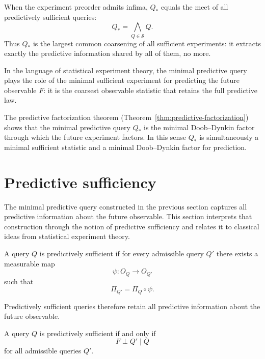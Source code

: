 \begin{remark}
When the experiment preorder admits infima, $Q_*$ equals the meet of
all predictively sufficient queries:
\[
Q_* = \bigwedge_{Q\in\mathcal S} Q.
\]
Thus $Q_*$ is the largest common coarsening of all sufficient
experiments: it extracts exactly the predictive information shared by
all of them, no more.
\end{remark}

\begin{remark}
In the language of statistical experiment theory, the minimal predictive
query plays the role of the minimal sufficient experiment for predicting
the future observable $F$: it is the coarsest observable statistic that
retains the full predictive law.
\end{remark}

\begin{remark}
The predictive factorization theorem (Theorem~\ref{thm:predictive-factorization})
shows that the minimal predictive query $Q_*$ is the minimal
Doob--Dynkin factor through which the future experiment factors.
In this sense $Q_*$ is simultaneously a minimal sufficient statistic
and a minimal Doob--Dynkin factor for prediction.
\end{remark}

\bigskip

\section{Predictive sufficiency}\label{sec:predictive-sufficiency}

The minimal predictive query constructed in the previous section
captures all predictive information about the future observable.
This section interprets that construction through the notion of
predictive sufficiency and relates it to classical ideas from
statistical experiment theory.

\begin{definition}
A query $Q$ is predictively sufficient if for every admissible query $Q'$
there exists a measurable map
\[
\psi:O_Q\to O_{Q'}
\]
such that
\[
\Pi_{Q'}=\Pi_Q\circ\psi.
\]
\end{definition}

Predictively sufficient queries therefore retain all predictive
information about the future observable.

\begin{theorem}
A query $Q$ is predictively sufficient if and only if
\[
F \perp Q' \mid Q
\]
for all admissible queries $Q'$.
\end{theorem}

